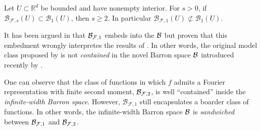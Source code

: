 \begin{proposition}

    Let $U \subset \mathbb{R}^d$ be bounded and have nonempty interior. For
    $s>0$, if $\mathcal{B}_{\mathcal{F},s}(U) \subset \mathcal{B}_{1}(U)$, then
    $s \geq 2$. In particular $\mathcal{B}_{\mathcal{F},1}(U) \not\subset
    \mathcal{B}_{1}(U)$.
\end{proposition}

\begin{remark}

    It has been argued in \cite{eRepresentationFormulasPointwise2020} that
    $\mathcal{B}_{\mathcal{F},1}$ embeds into the $\mathcal{B}$ but
    \cite{carageaNeuralNetworkApproximation2022} proven that this embedment
    wrongly interpretes the results of
    \cite{barronUniversalApproximationBounds1993,barronNeuralNetApproximation1992}.
    In other words, the original model class proposed by
    \cite{barronNeuralNetApproximation1992} is not \textit{contained} in the
    novel Barron space $\mathcal{B}$ introduced recently by
    \cite{eBarronSpaceFlowinduced2021}. 
    

    One can observe that the class of functions in which $f$ admits a Fourier
    representation with finite second moment, $\mathcal{B}_{\mathcal{F}, 2}$, is well
    ``contained'' inside the \textit{infinite-width Barron space}. However,
    $\mathcal{B}_{\mathcal{F}, 1}$ still encapsulates a boarder class of
    functions. In other words, the infinite-width Barron space $\mathcal{B}$ is
    \textit{sandwiched} between $\mathcal{B}_{\mathcal{F}, 1}$ and $\mathcal{B}_{\mathcal{F},
    2}$.
\end{remark}


